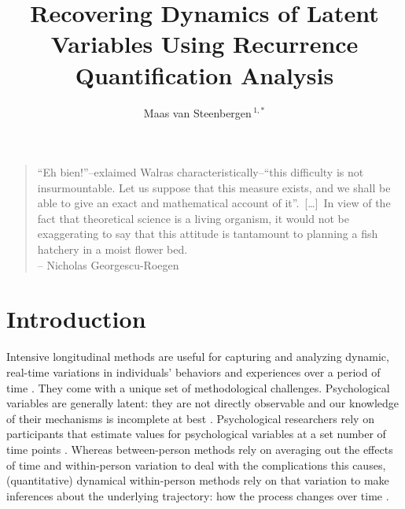 \documentclass[utf8]{FrontiersinVancouver}
\def\firstAuthorLast{van Steenbergen} %
\def\Authors{Maas van Steenbergen\,$^{1,*}$}
\begin{document}
\onecolumn
{}

\title[Recovering Dynamics Using RQA]{Recovering Dynamics of Latent Variables Using Recurrence Quantification Analysis} 

\author[\firstAuthorLast]{\Authors} %
\address{} %
\correspondance{} %

\extraAuth{}%

\maketitle


\begin{quote}
    ``Eh bien!''--exlaimed Walras characteristically--``this difficulty is not insurmountable. Let us suppose that this measure exists, and we shall be able to give an exact and mathematical account of it''.\ 
    [\dots]\ In view of the fact that theoretical science is a living organism, it would not be exaggerating to say that this attitude is tantamount to planning a fish hatchery in a moist flower bed.\\
    -- Nicholas Georgescu-Roegen
\end{quote}
\section{Introduction}
Intensive longitudinal methods are useful for capturing and analyzing dynamic, real-time variations in individuals' behaviors and experiences over a period of time \citep{bolgerIntensiveLongitudinalMethods2013}.  They come with a unique set of methodological challenges. Psychological variables are generally latent: they are not directly observable and our knowledge of their mechanisms is incomplete at best \citep{bollenLatentVariablesPsychology2002}. Psychological researchers rely on participants that estimate values for psychological variables at a set number of time points \citep{borsboomLatentVariableTheory2008}. Whereas between-person methods rely on averaging out the effects of time and within-person variation to deal with the complications this causes, (quantitative) dynamical within-person methods rely on that variation to make inferences about the underlying trajectory: how the process changes over time \citep{bokerConsequencesContinuityHunt2002, molenaarManifestoPsychologyIdiographic2004,lamiellStatisticalThinkingPsychology2019}.
\end{document}
